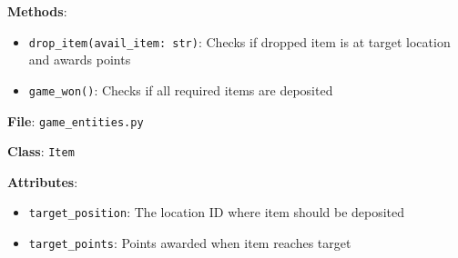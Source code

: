 \documentclass[11pt]{article}
\begin{document}
\begin{enumerate}
    \textbf{Methods}:
    \begin{itemize}
        \item \texttt{drop\_item(avail\_item: str)}: Checks if dropped item is at target location and awards points
        \item \texttt{game\_won()}: Checks if all required items are deposited
    \end{itemize}
    
    \textbf{File}: \texttt{game\_entities.py}
    
    \textbf{Class}: \texttt{Item}
    
    \textbf{Attributes}:
    \begin{itemize}
        \item \texttt{target\_position}: The location ID where item should be deposited
        \item \texttt{target\_points}: Points awarded when item reaches target
    \end{itemize}
\end{enumerate}
\end{document}
